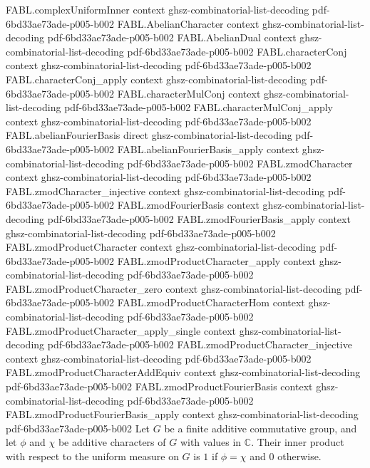\begin{theorem}
\label{FABL.characters_orthonormal}
\leanok
{}
\proofstep
  {FABL.complexUniformInner}
  {context}
  {ghsz-combinatorial-list-decoding}
  {pdf-6bd33ae73ade-p005-b002}
\proofstep
  {FABL.AbelianCharacter}
  {context}
  {ghsz-combinatorial-list-decoding}
  {pdf-6bd33ae73ade-p005-b002}
\proofstep
  {FABL.AbelianDual}
  {context}
  {ghsz-combinatorial-list-decoding}
  {pdf-6bd33ae73ade-p005-b002}
\proofstep
  {FABL.characterConj}
  {context}
  {ghsz-combinatorial-list-decoding}
  {pdf-6bd33ae73ade-p005-b002}
\proofstep
  {FABL.characterConj_apply}
  {context}
  {ghsz-combinatorial-list-decoding}
  {pdf-6bd33ae73ade-p005-b002}
\proofstep
  {FABL.characterMulConj}
  {context}
  {ghsz-combinatorial-list-decoding}
  {pdf-6bd33ae73ade-p005-b002}
\proofstep
  {FABL.characterMulConj_apply}
  {context}
  {ghsz-combinatorial-list-decoding}
  {pdf-6bd33ae73ade-p005-b002}
\proofstep
  {FABL.abelianFourierBasis}
  {direct}
  {ghsz-combinatorial-list-decoding}
  {pdf-6bd33ae73ade-p005-b002}
\proofstep
  {FABL.abelianFourierBasis_apply}
  {context}
  {ghsz-combinatorial-list-decoding}
  {pdf-6bd33ae73ade-p005-b002}
\proofstep
  {FABL.zmodCharacter}
  {context}
  {ghsz-combinatorial-list-decoding}
  {pdf-6bd33ae73ade-p005-b002}
\proofstep
  {FABL.zmodCharacter_injective}
  {context}
  {ghsz-combinatorial-list-decoding}
  {pdf-6bd33ae73ade-p005-b002}
\proofstep
  {FABL.zmodFourierBasis}
  {context}
  {ghsz-combinatorial-list-decoding}
  {pdf-6bd33ae73ade-p005-b002}
\proofstep
  {FABL.zmodFourierBasis_apply}
  {context}
  {ghsz-combinatorial-list-decoding}
  {pdf-6bd33ae73ade-p005-b002}
\proofstep
  {FABL.zmodProductCharacter}
  {context}
  {ghsz-combinatorial-list-decoding}
  {pdf-6bd33ae73ade-p005-b002}
\proofstep
  {FABL.zmodProductCharacter_apply}
  {context}
  {ghsz-combinatorial-list-decoding}
  {pdf-6bd33ae73ade-p005-b002}
\proofstep
  {FABL.zmodProductCharacter_zero}
  {context}
  {ghsz-combinatorial-list-decoding}
  {pdf-6bd33ae73ade-p005-b002}
\proofstep
  {FABL.zmodProductCharacterHom}
  {context}
  {ghsz-combinatorial-list-decoding}
  {pdf-6bd33ae73ade-p005-b002}
\proofstep
  {FABL.zmodProductCharacter_apply_single}
  {context}
  {ghsz-combinatorial-list-decoding}
  {pdf-6bd33ae73ade-p005-b002}
\proofstep
  {FABL.zmodProductCharacter_injective}
  {context}
  {ghsz-combinatorial-list-decoding}
  {pdf-6bd33ae73ade-p005-b002}
\proofstep
  {FABL.zmodProductCharacterAddEquiv}
  {context}
  {ghsz-combinatorial-list-decoding}
  {pdf-6bd33ae73ade-p005-b002}
\proofstep
  {FABL.zmodProductFourierBasis}
  {context}
  {ghsz-combinatorial-list-decoding}
  {pdf-6bd33ae73ade-p005-b002}
\proofstep
  {FABL.zmodProductFourierBasis_apply}
  {context}
  {ghsz-combinatorial-list-decoding}
  {pdf-6bd33ae73ade-p005-b002}
Let $G$ be a finite additive commutative group, and let $\phi$ and $\chi$ be additive
characters of $G$ with values in $\mathbb C$. Their inner product with respect to the
uniform measure on $G$ is $1$ if $\phi=\chi$ and $0$ otherwise.
\end{theorem}

